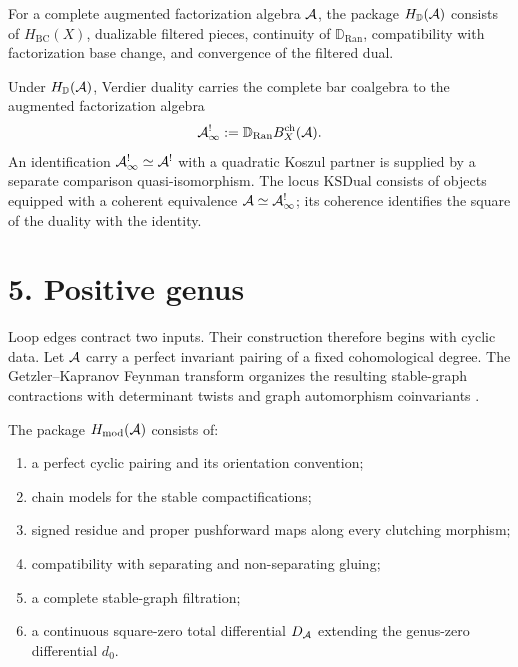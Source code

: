 \begin{definition}
\label{def:preface-verdier-package}
For a complete augmented factorization algebra \(\mathcal{A}\), the package
\(H_{\mathbb D}(\mathcal{A})\) consists of
\(H_{\mathrm{BC}}(X)\), dualizable filtered pieces, continuity of
\(\mathbb D_{\operatorname{Ran}}\), compatibility with factorization
base change, and convergence of the filtered dual.
\end{definition}

Under \(H_{\mathbb D}(\mathcal{A})\), Verdier duality carries the complete
bar coalgebra to the augmented factorization algebra
\[
 \mathcal{A}^!_\infty
 :=\mathbb D_{\operatorname{Ran}}B_X^{\mathrm{ch}}(\mathcal{A}).
\]
An identification \(\mathcal{A}^!_\infty\simeq\mathcal{A}^!\) with a quadratic
Koszul partner is supplied by a separate comparison
quasi-isomorphism.  The locus \(\mathrm{KSDual}\) consists of objects
equipped with a coherent equivalence
\(\mathcal{A}\simeq\mathcal{A}^!_\infty\); its coherence identifies the square of the
duality with the identity.

\section*{5.  Positive genus}

Loop edges contract two inputs.  Their construction therefore begins
with cyclic data.  Let \(\mathcal{A}\) carry a perfect invariant pairing of a
fixed cohomological degree.  The Getzler--Kapranov Feynman transform
organizes the resulting stable-graph contractions with determinant
twists and graph automorphism coinvariants
\cite[\S5]{GetzlerKapranov98}.

\begin{definition}
\label{def:preface-modular-package}
The package \(H_{\mathrm{mod}}(\mathcal{A})\) consists of:
\begin{enumerate}[label=\textup{(\roman*)},leftmargin=*]
\item a perfect cyclic pairing and its orientation convention;
\item chain models for the stable compactifications;
\item signed residue and proper pushforward maps along every clutching
 morphism;
\item compatibility with separating and non-separating gluing;
\item a complete stable-graph filtration;
\item a continuous square-zero total differential
 \(D_{\mathcal{A}}\) extending the genus-zero differential \(d_0\).
\end{enumerate}
\end{definition}

